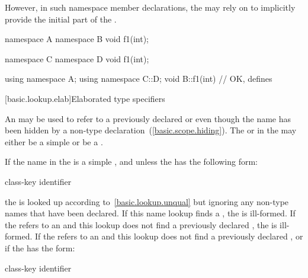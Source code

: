 \exitexampleb However, in such namespace member declarations, the
 may rely on 
to implicitly provide the initial part of the
. \enterexample

\begin{codeblock}
namespace A {
	namespace B {
		void f1(int);
	}
}

namespace C {
	namespace D {
		void f1(int);
	}
}

using namespace A;
using namespace C::D;
void B::f1(int){}		// OK, defines 
\end{codeblock}
\exitexampleb
{}%

[basic.lookup.elab]{Elaborated type specifiers}%
%

\pnum
An  may be
used to refer to a previously declared  or
 even though the name has been hidden by a non-type
declaration~(\ref{basic.scope.hiding}). The  or
 in the 
may either be a simple  or be a
.

\pnum
If the name in the  is a simple
, and unless the
 has the following form:

\begin{ncbnf}
class-key identifier \terminal{;}
\end{ncbnf}

the  is looked up according
to~\ref{basic.lookup.unqual} but ignoring any non-type names that have
been declared. If this name lookup finds a , the
 is ill-formed. If the
 refers to an
 and this lookup does not find a previously
declared , the 
is ill-formed. If the  refers to an
 and this lookup does not find a previously
declared , or if the
 has the form:

\begin{ncbnf}
class-key identifier \terminal{;}
\end{ncbnf}


